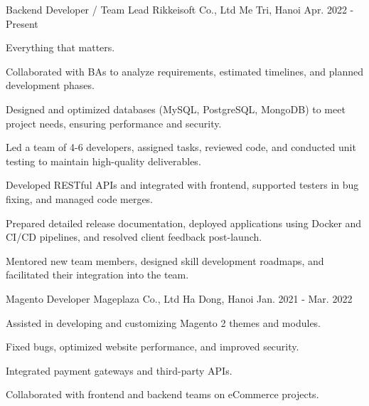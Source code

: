 

\begin{cventries}

  \cventry
    {Backend Developer / Team Lead} %
    {Rikkeisoft Co., Ltd} %
    {Me Tri, Hanoi} %
    {Apr. 2022 - Present} %
    {
      \begin{cvitems} %
        \item {Everything that matters.}
        \item {Collaborated with BAs to analyze requirements, estimated timelines, and planned development phases.}
        \item {Designed and optimized databases (MySQL, PostgreSQL, MongoDB) to meet project needs, ensuring performance and security.}
        \item {Led a team of 4-6 developers, assigned tasks, reviewed code, and conducted unit testing to maintain high-quality deliverables.}
        \item {Developed RESTful APIs and integrated with frontend, supported testers in bug fixing, and managed code merges.}
        \item {Prepared detailed release documentation, deployed applications using Docker and CI/CD pipelines, and resolved client feedback post-launch.}
        \item {Mentored new team members, designed skill development roadmaps, and facilitated their integration into the team.}
      \end{cvitems}
    }

  \cventry
    {Magento Developer} %
    {Mageplaza Co., Ltd} %
    {Ha Dong, Hanoi} %
    {Jan. 2021 - Mar. 2022} %
    {
      \begin{cvitems} %
        \item {Assisted in developing and customizing Magento 2 themes and modules.}
        \item {Fixed bugs, optimized website performance, and improved security.}
        \item {Integrated payment gateways and third-party APIs.}
        \item {Collaborated with frontend and backend teams on eCommerce projects.}
      \end{cvitems}
    }

\end{cventries}
